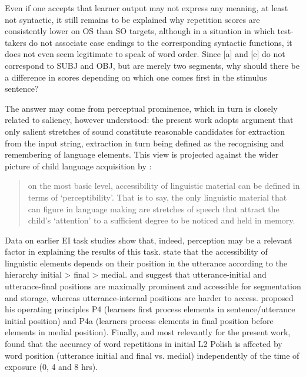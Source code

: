 Even if one accepts that learner output may not express any meaning, at least not syntactic, it still remains to be explained why repetition scores are consistently lower on OS than SO targets, although in a situation in which test-takers do not associate case endings to the corresponding syntactic functions, it does not even seem legitimate to speak of word order. Since [a] and [e] do not correspond to SUBJ and OBJ, but are merely two segments, why should there be a difference in scores depending on which one comes first in the stimulus sentence?

The answer may come from perceptual prominence, which in turn is closely related to saliency, however understood: the present work adopts  argument that only salient stretches of sound constitute reasonable candidates for extraction from the input string, extraction in turn being defined as the recognising and remembering of language elements. This view is projected against the wider picture of child language acquisition by \citet[1164]{Slobin1985}: 

\begin{quote}
on the most basic level, accessibility of linguistic material can be defined in terms of ‘perceptibility’. That is to say, the only linguistic material that can figure in language making are stretches of speech that attract the child’s ‘attention’ to a sufficient degree to be noticed and held in memory.
\end{quote}

Data on earlier EI task studies show that, indeed, perception may be a relevant factor in explaining the results of this task. \citet{GallimoreTharp1981} state that the accessibility of linguistic elements depends on their position in the utterance according to the hierarchy initial > final > medial. \citet{Peters1985} and \citet[1166]{Slobin1985} suggest that utterance-initial and utterance-final positions are maximally prominent and accessible for segmentation and storage, whereas utterance-internal positions are harder to access. \citet[300]{VanPatten2000} proposed his operating principles P4 (learners first process elements in sentence/utterance initial position) and P4a (learners process elements in final position before elements in medial position). Finally, and most relevantly for the present work, \citet[151]{Rast2008} found that the accuracy of word repetitions in initial L2 Polish is affected by word position (utterance initial and final vs. medial) independently of the time of exposure (0, 4 and 8 hrs). 

